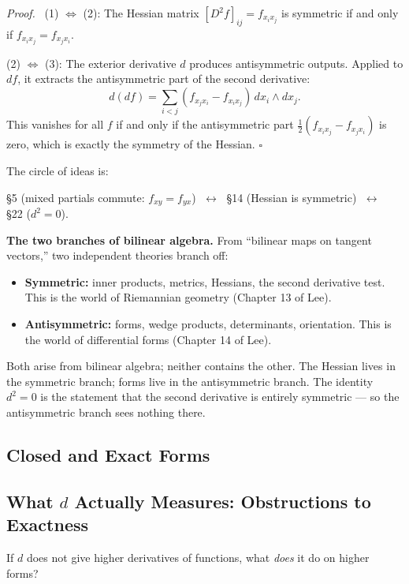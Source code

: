 \documentclass[11pt]{report}
\renewenvironment{proof}[1][Proof]{\par\noindent\textit{#1.}\ }{\hfill$\square$\par\medskip}
\begin{document}
\begin{proof}
(1) $\Leftrightarrow$ (2): The Hessian matrix $[D^2f]_{ij} = f_{x_ix_j}$ is symmetric if and only if $f_{x_ix_j} = f_{x_jx_i}$.

(2) $\Leftrightarrow$ (3): The exterior derivative $d$ produces antisymmetric outputs. Applied to $df$, it extracts the antisymmetric part of the second derivative:
\[
d(df) = \sum_{i < j} (f_{x_j x_i} - f_{x_i x_j})\,dx_i \wedge dx_j.
\]
This vanishes for all $f$ if and only if the antisymmetric part $\frac{1}{2}(f_{x_ix_j} - f_{x_jx_i})$ is zero, which is exactly the symmetry of the Hessian.
\end{proof}

The circle of ideas is:

\begin{center}
\S5 (mixed partials commute: $f_{xy} = f_{yx}$) $\;\longleftrightarrow\;$ \S14 (Hessian is symmetric) $\;\longleftrightarrow\;$ \S22 ($d^2 = 0$).
\end{center}

\textbf{The two branches of bilinear algebra.} From ``bilinear maps on tangent vectors,'' two independent theories branch off:
\begin{itemize}
    \item \textbf{Symmetric:} inner products, metrics, Hessians, the second derivative test. This is the world of Riemannian geometry (Chapter 13 of Lee).
    \item \textbf{Antisymmetric:} forms, wedge products, determinants, orientation. This is the world of differential forms (Chapter 14 of Lee).
\end{itemize}

Both arise from bilinear algebra; neither contains the other. The Hessian lives in the symmetric branch; forms live in the antisymmetric branch. The identity $d^2 = 0$ is the statement that the second derivative is entirely symmetric --- so the antisymmetric branch sees nothing there.

\subsection{Closed and Exact Forms}

\subsection*{What $d$ Actually Measures: Obstructions to Exactness}

If $d$ does not give higher derivatives of functions, what \textit{does} it do on higher forms?
\end{document}
